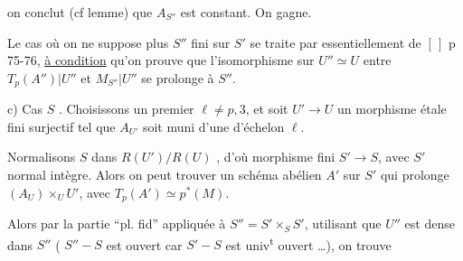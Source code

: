 on conclut (cf lemme) que $A_{S''}$ est constant.  On gagne.

Le cas où on ne suppose plus $S''$ fini sur $S'$ se traite par  essentiellement de $[\,]$ p 75-76, \uline{à condition} qu'on prouve que l'isomorphisme sur $U''\simeq U$ entre $T_p(A'')|U''$ et $M_{S''}|U''$ se prolonge à $S''$.  

c) Cas $S$  . Choisissons un  premier $\ell\neq p,3$, et soit $U'\longrightarrow U$ un morphisme étale fini surjectif  tel que $A_{U'}$ soit muni d'une  d'échelon $\ell$.

Normalisons $S$ dans $R(U')/R(U)$ , d'où morphisme fini  $S'\longrightarrow S$,  avec $S'$ normal intègre. Alors on peut trouver un schéma abélien $A'$ sur $S'$ qui prolonge $(A_U)\times_U U'$, avec $T_p(A')\simeq p^*(M)$.

Alors par la partie ``pl. fid'' appliquée à $S''=S'\times_S S'$, utilisant que $U''$ est dense dans $S''$ (  $S''-S$ est ouvert car $S'-S$ est univ\textsuperscript{t} ouvert \ldots), on trouve

